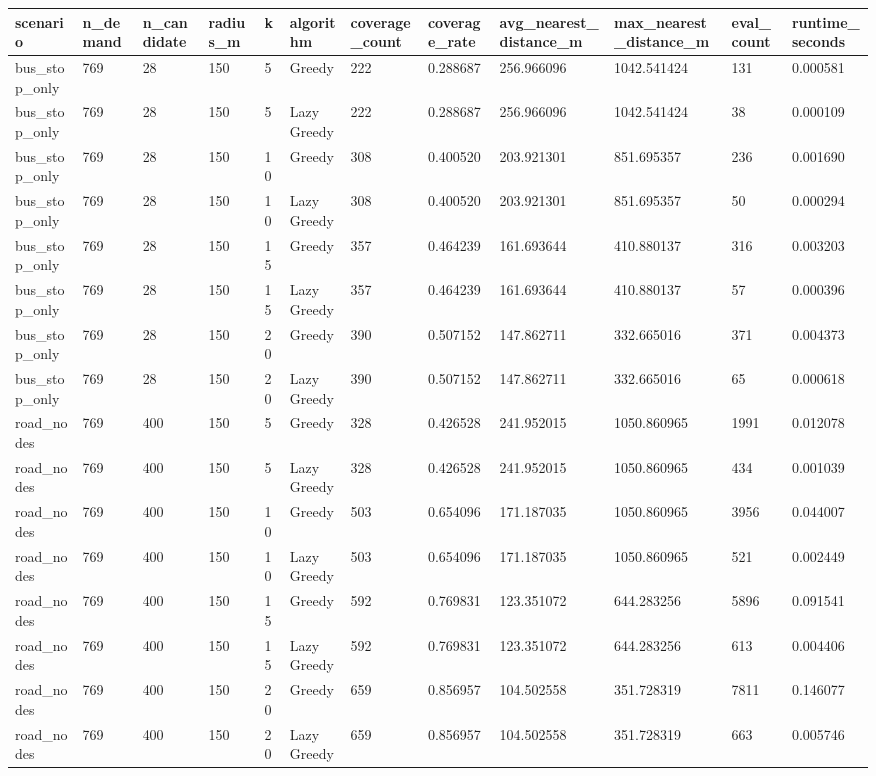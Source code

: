 \begin{tabular}{llllllllllll}
\hline
scenario & n_demand & n_candidate & radius_m & k & algorithm & coverage_count & coverage_rate & avg_nearest_distance_m & max_nearest_distance_m & eval_count & runtime_seconds \\
\hline
bus_stop_only & 769 & 28 & 150 & 5 & Greedy & 222 & 0.288687 & 256.966096 & 1042.541424 & 131 & 0.000581 \\
bus_stop_only & 769 & 28 & 150 & 5 & Lazy Greedy & 222 & 0.288687 & 256.966096 & 1042.541424 & 38 & 0.000109 \\
bus_stop_only & 769 & 28 & 150 & 10 & Greedy & 308 & 0.400520 & 203.921301 & 851.695357 & 236 & 0.001690 \\
bus_stop_only & 769 & 28 & 150 & 10 & Lazy Greedy & 308 & 0.400520 & 203.921301 & 851.695357 & 50 & 0.000294 \\
bus_stop_only & 769 & 28 & 150 & 15 & Greedy & 357 & 0.464239 & 161.693644 & 410.880137 & 316 & 0.003203 \\
bus_stop_only & 769 & 28 & 150 & 15 & Lazy Greedy & 357 & 0.464239 & 161.693644 & 410.880137 & 57 & 0.000396 \\
bus_stop_only & 769 & 28 & 150 & 20 & Greedy & 390 & 0.507152 & 147.862711 & 332.665016 & 371 & 0.004373 \\
bus_stop_only & 769 & 28 & 150 & 20 & Lazy Greedy & 390 & 0.507152 & 147.862711 & 332.665016 & 65 & 0.000618 \\
road_nodes & 769 & 400 & 150 & 5 & Greedy & 328 & 0.426528 & 241.952015 & 1050.860965 & 1991 & 0.012078 \\
road_nodes & 769 & 400 & 150 & 5 & Lazy Greedy & 328 & 0.426528 & 241.952015 & 1050.860965 & 434 & 0.001039 \\
road_nodes & 769 & 400 & 150 & 10 & Greedy & 503 & 0.654096 & 171.187035 & 1050.860965 & 3956 & 0.044007 \\
road_nodes & 769 & 400 & 150 & 10 & Lazy Greedy & 503 & 0.654096 & 171.187035 & 1050.860965 & 521 & 0.002449 \\
road_nodes & 769 & 400 & 150 & 15 & Greedy & 592 & 0.769831 & 123.351072 & 644.283256 & 5896 & 0.091541 \\
road_nodes & 769 & 400 & 150 & 15 & Lazy Greedy & 592 & 0.769831 & 123.351072 & 644.283256 & 613 & 0.004406 \\
road_nodes & 769 & 400 & 150 & 20 & Greedy & 659 & 0.856957 & 104.502558 & 351.728319 & 7811 & 0.146077 \\
road_nodes & 769 & 400 & 150 & 20 & Lazy Greedy & 659 & 0.856957 & 104.502558 & 351.728319 & 663 & 0.005746 \\
\hline
\end{tabular}

